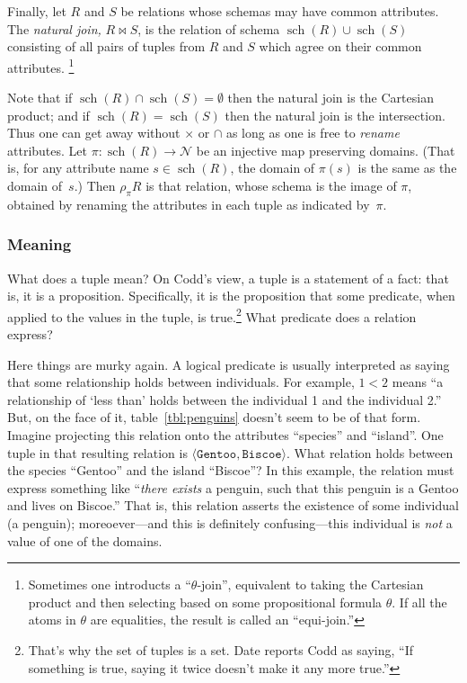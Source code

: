 \documentclass[10pt, a4paper, twocolumn]{article}
\DeclareMathOperator{\schema}{sch}
\begin{document}
Finally, let $R$ and $S$ be relations whose schemas may have common
attributes. The \emph{natural join,} $R \bowtie S$, is the relation of schema
$\schema(R) \cup \schema(S)$ consisting of all pairs of tuples from $R$ and $S$
which agree on their common attributes.%
\footnote{Sometimes one introducts a ``$\theta$-join'', equivalent to taking the
Cartesian product and then selecting based on some propositional formula $\theta$. If
all the atoms in $\theta$ are equalities, the result is called an ``equi-join.''}

Note that if $\schema(R)\cap\schema(S)=\emptyset$ then the natural join is the Cartesian
product; and if $\schema(R) = \schema(S)$ then the natural join is the
intersection. Thus one can get away without $\times$ or $\cap$ as long as one is free to
\emph{rename} attributes. Let $\pi:\schema(R)\to\mathscr{N}$ be an injective map
preserving domains. (That is, for any attribute name $s\in\schema(R)$, the domain
of $\pi(s)$ is the same as the domain of~$s$.) Then $\rho_\pi R$ is that relation,
whose schema is the image of $\pi$, obtained by renaming the attributes in each
tuple as indicated by~$\pi$.

\subsubsection{Meaning}
What does a tuple mean? On Codd's view, a tuple is a statement of a fact: that
is, it is a proposition. Specifically, it is the proposition that some
predicate, when applied to the values in the tuple, is true.\footnote{That's why
the set of tuples is a set. Date reports Codd as saying, ``If something is true,
saying it twice doesn’t make it any more true.''} What predicate does a relation
express?

Here things are murky again. A logical predicate is usually interpreted as
saying that some relationship holds between individuals. For example, $1<2$
means ``a relationship of `less than' holds between the individual 1 and the
individual 2.'' But, on the face of it, table~\ref{tbl:penguins} doesn't seem to
be of that form. Imagine projecting this relation onto the attributes
``species'' and ``island''. One tuple in that resulting relation is $\langle
\mathtt{Gentoo}, \mathtt{Biscoe} \rangle$. What relation holds between the species
``Gentoo'' and the island ``Biscoe''? In this example, the relation must express
something like ``\emph{there exists} a penguin, such that this penguin is a
Gentoo and lives on Biscoe.'' That is, this relation asserts the existence of
some individual (a penguin); moreoever---and this is definitely confusing---this
individual is \emph{not} a value of one of the domains.
\end{document}
